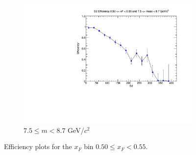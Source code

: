 \begin{figure}[p]
\begin{subfigure}[b]{0.32\textwidth}
        \includegraphics[width=\textwidth]{./kTrackerEfficiencyPlots/D2_Efficiency_xF10_mass10.pdf}
        \caption{$7.5 \leq m < 8.7$ GeV/$c^2$}
        \label{fig:xF10_mass10}
    \end{subfigure}
    \hfill
    \caption{Efficiency plots for the $x_F$ bin $0.50 \leq x_F < 0.55$.}
    \label{fig:xF10}
\end{figure}

\clearpage

